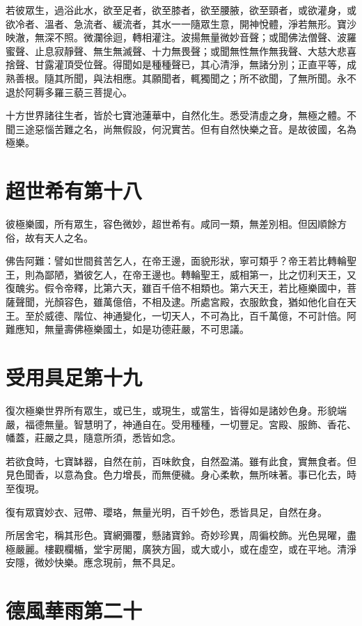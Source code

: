 \documentclass{zhvt-classic}
\begin{document}
若彼眾生，過浴此水，欲至足者，欲至膝者，欲至腰腋，欲至頸者，或欲灌身，或欲冷者、溫者、急流者、緩流者，其水一一隨眾生意，開神悅體，淨若無形。寶沙映澈，無深不照。微瀾徐迴，轉相灌注。波揚無量微妙音聲；或聞佛法僧聲、波羅蜜聲、止息寂靜聲、無生無滅聲、十力無畏聲；或聞無性無作無我聲、大慈大悲喜捨聲、甘露灌頂受位聲。得聞如是種種聲已，其心清淨，無諸分別；正直平等，成熟善根。隨其所聞，與法相應。其願聞者，輒獨聞之；所不欲聞，了無所聞。永不退於阿耨多羅三藐三菩提心。

十方世界諸往生者，皆於七寶池蓮華中，自然化生。悉受清虛之身，無極之體。不聞三途惡惱苦難之名，尚無假設，何況實苦。但有自然快樂之音。是故彼國，名為極樂。

\chapter*{超世希有第十八}

彼極樂國，所有眾生，容色微妙，超世希有。咸同一類，無差別相。但因順餘方俗，故有天人之名。

佛告阿難：譬如世間貧苦乞人，在帝王邊，面貌形狀，寧可類乎？帝王若比轉輪聖王，則為鄙陋，猶彼乞人，在帝王邊也。轉輪聖王，威相第一，比之忉利天王，又復醜劣。假令帝釋，比第六天，雖百千倍不相類也。第六天王，若比極樂國中，菩薩聲聞，光顏容色，雖萬億倍，不相及逮。所處宮殿，衣服飲食，猶如他化自在天王。至於威德、階位、神通變化，一切天人，不可為比，百千萬億，不可計倍。阿難應知，無量壽佛極樂國土，如是功德莊嚴，不可思議。

\chapter*{受用具足第十九}

復次極樂世界所有眾生，或已生，或現生，或當生，皆得如是諸妙色身。形貌端嚴，福德無量。智慧明了，神通自在。受用種種，一切豐足。宮殿、服飾、香花、幡蓋，莊嚴之具，隨意所須，悉皆如念。

若欲食時，七寶缽器，自然在前，百味飲食，自然盈滿。雖有此食，實無食者。但見色聞香，以意為食。色力增長，而無便穢。身心柔軟，無所味著。事已化去，時至復現。

復有眾寶妙衣、冠帶、瓔珞，無量光明，百千妙色，悉皆具足，自然在身。

所居舍宅，稱其形色。寶網彌覆，懸諸寶鈴。奇妙珍異，周徧校飾。光色晃曜，盡極嚴麗。樓觀欄楯，堂宇房閣，廣狹方圓，或大或小，或在虛空，或在平地。清淨安隱，微妙快樂。應念現前，無不具足。

\chapter*{德風華雨第二十}
\end{document}
